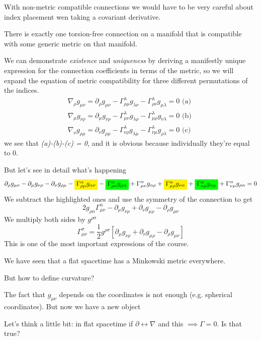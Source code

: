 With non-metric compatible connections we would have to be very careful about index placement wen taking a covariant derivative. \par
There is exactly one torsion-free connection on a manifold that is compatible with some generic metric on that manifold. \par

We can demonstrate \emph{existence} and \emph{uniqueness} by deriving a manifestly unique expression for the connection coefficients in terms of the metric, so we will expand the equation of metric compatibility for three different permutations of the indices.
\begin{gather*}
\nabla _{\rho }g_{\mu \nu } = \partial_{\rho }g_{\mu \nu } - \Gamma ^{\lambda }_{\rho \mu }g_{ \lambda \nu  } - \Gamma ^{\lambda }_{\rho \nu } g_{\mu \lambda }=0  \text{ (a) }\\
\nabla _{\mu }g_{\nu \rho } = \partial_{\mu }g_{\nu \rho } - \Gamma ^{\lambda }_{\mu \nu }g_{\lambda \rho } - \Gamma ^{\lambda }_{\mu \rho }g_{\nu \lambda } =0 \text{ (b) }\\
\nabla _{\nu }g_{\rho \mu } = \partial_{\nu }g_{\rho \mu } - \Gamma ^{\lambda }_{\nu \rho } g_{\lambda \mu } - \Gamma ^{\lambda }_{\nu \mu } g_{\rho  \lambda } = 0 \text{ (c) }
\end{gather*}
we see that \emph{(a)-(b)-(c) = 0}, and it is obvious because individually they're equal to 0. \par
But let's see in detail what's happening
\begin{gather*}
\partial_{\rho }g_{\mu \nu } - \partial_{\mu }g_{\nu \rho } - \partial_{\nu }g_{\rho \mu } - \colorbox{yellow}{$ \Gamma^{\alpha }_{\rho \mu }g_{\alpha \nu }  $} - \colorbox{green}{$ \Gamma ^{\alpha }_{\rho \nu }g_{\mu \alpha }  $} + \Gamma ^{\alpha }_{\mu \nu }g_{\alpha \rho } + \colorbox{yellow}{$ \Gamma^{\alpha }_{\mu \rho }g_{\nu \alpha }  $} + \colorbox{green}{$ \Gamma ^{\alpha }_{\nu \rho }g_{\alpha \mu }  $} + \Gamma ^{\alpha }_{\nu \mu }g_{\rho \alpha } = 0 \\
\end{gather*}
 We subtract the highlighted ones and use the symmetry of the connection to get
 \[
 2g_{\rho \alpha }\Gamma ^{\alpha }_{\mu \nu } - \partial_{\mu }g_{\nu \rho } + \partial_{\nu }g_{\mu \rho } - \partial_{\rho }g_{\mu \nu }
 \]
 We multiply both sides by $g^{\rho \sigma }$	
\begin{equation}
	\Gamma^{\sigma }_{\mu \nu } = \frac{1}{2} g^{\rho \sigma } [\partial_{\mu } g_{\nu \rho } + \partial_{\nu } g_{\mu \rho } - \partial_{\rho }g_{\mu \nu } ]
\end{equation}
 This is one of the most important expressions of the course. \par
 We have seen that a flat spacetime has a Minkowski metric everywhere. \par
 But how to define curvature? \par
 The fact that $g_{\mu \nu }$ depends on the coordinates is not enough (e.g. spherical coordinates). But now we have a new object\par
 Let's think a little bit: in flat spacetime if $\partial \leftrightarrow \nabla $ and this $\implies \Gamma  = 0$. Is that true? \par
 
